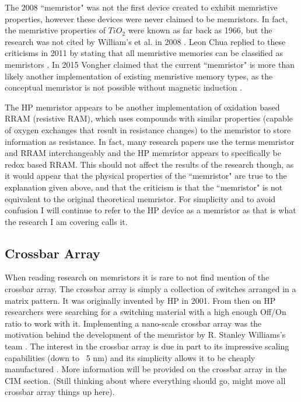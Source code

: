 \documentclass{sig-alternate}
\begin{document}
The 2008 ``memristor" was not the first device created to exhibit memristive properties, however these devices were never claimed to be memristors.  In fact, the memristive properties of $TiO_{2}$ were known as far back as 1966, but the research was not cited by William's et al. in 2008 \cite{1968SSEle..11..535A} \cite{MemFound}.  Leon Chua replied to these criticisms in 2011 by stating that all memristive memories can be classified as memristors \cite{chua2}.   In 2015 Vongher claimed that the current ``memristor" is more than likely another implementation of existing memristive memory types, as the conceptual memristor is not possible without magnetic induction \cite{MemNotFound}.  

The HP memristor appears to be another implementation of oxidation based RRAM (resistive RAM), which uses compounds with similar properties (capable of oxygen exchanges that result in resistance changes) to the memristor to store information as resistance.  In fact, many research papers use the terms memristor and RRAM interchangeably and the HP memristor appears to specifically be redox based RRAM.  This should not affect the results of the research though, as it would appear that the physical properties of the ``memristor" are true to the explanation given above, and that the criticism is that the ``memristor" is not equivalent to the original theoretical memristor.  For simplicity and to avoid confusion I will continue to refer to the HP device as a memristor as that is what the research I am covering calls it.

\subsection{Crossbar Array}
\label{sec:cross}

When reading research on memristors it is rare to not find mention of the crossbar array.  The crossbar array is simply a collection of switches arranged in a matrix pattern. It was originally invented by HP in 2001.  From then on HP researchers were searching for a switching material with a high enough Off/On ratio to work with it.  Implementing a nano-scale crossbar array was the motivation behind the development of the memristor by R. Stanley Williams's team \cite{MemFound}.  The interest in the crossbar array is due in part to its impressive scaling capabilities (down to ~5 nm) and its simplicity allows it to be cheaply manufactured \cite{Hamdioui:2015:MBC:2755753.2757210}.  More information will be provided on the crossbar array in the CIM section. (Still thinking about where everything should go, might move all crossbar array things up here).
\end{document}
